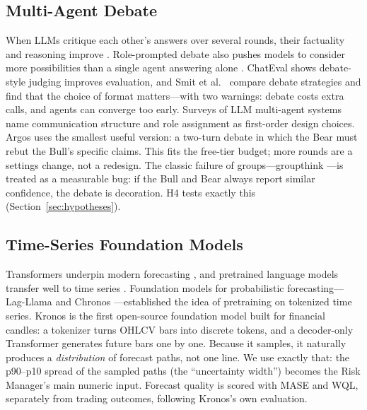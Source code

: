 \documentclass[conference]{IEEEtran}
\newcommand{\sys}{Argos}
\begin{document}
\subsection{Multi-Agent Debate}
When LLMs critique each other's answers over several rounds, their factuality and reasoning improve \cite{du2023debate}. Role-prompted debate also pushes models to consider more possibilities than a single agent answering alone \cite{liang2023divergent}. ChatEval \cite{chan2023chateval} shows debate-style judging improves evaluation, and Smit et al.\ \cite{smit2024mad} compare debate strategies and find that the choice of format matters---with two warnings: debate costs extra calls, and agents can converge too early. Surveys of LLM multi-agent systems \cite{guo2024llmmultiagents} name communication structure and role assignment as first-order design choices. \sys{} uses the smallest useful version: a two-turn debate in which the Bear must rebut the Bull's specific claims. This fits the free-tier budget; more rounds are a settings change, not a redesign. The classic failure of groups---groupthink \cite{janis1972groupthink}---is treated as a measurable bug: if the Bull and Bear always report similar confidence, the debate is decoration. H4 tests exactly this (Section~\ref{sec:hypotheses}).

\subsection{Time-Series Foundation Models}
Transformers underpin modern forecasting \cite{vaswani2017attention,nie2023patchtst}, and pretrained language models transfer well to time series \cite{zhou2023onefitsall}. Foundation models for probabilistic forecasting---Lag-Llama \cite{rasul2023lagllama} and Chronos \cite{ansari2024chronos}---established the idea of pretraining on tokenized time series. Kronos \cite{shi2025kronos} is the first open-source foundation model built for financial candles: a tokenizer turns OHLCV bars into discrete tokens, and a decoder-only Transformer generates future bars one by one. Because it samples, it naturally produces a \emph{distribution} of forecast paths, not one line. We use exactly that: the p90--p10 spread of the sampled paths (the ``uncertainty width'') becomes the Risk Manager's main numeric input. Forecast quality is scored with MASE \cite{hyndman2006another} and WQL, separately from trading outcomes, following Kronos's own evaluation.
\end{document}
